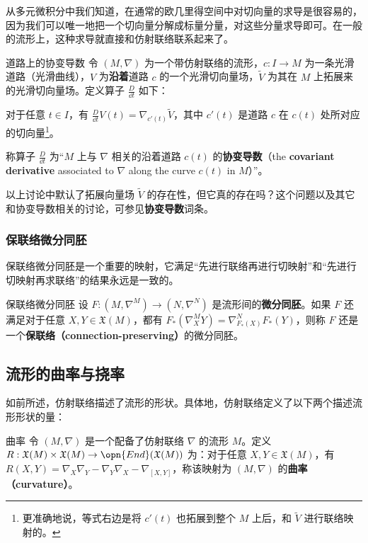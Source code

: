 从多元微积分中我们知道，在通常的欧几里得空间中对切向量的求导是很容易的，因为我们可以唯一地把一个切向量分解成标量分量，对这些分量求导即可。在一般的流形上，这种求导就直接和仿射联络联系起来了。

\begin{definition}{道路上的协变导数}
令 $(M, \nabla)$ 为一个带仿射联络的流形，$c:I\to M$ 为一条光滑道路（光滑曲线），$V$ 为\textbf{沿着}道路 $c$ 的一个光滑切向量场，$\tilde{V}$ 为其在 $M$ 上拓展来的光滑切向量场。定义算子 $\frac{D}{\dd t}$ 如下：

对于任意 $t\in I$，有 $\frac{D}{\dd t}V(t)=\nabla_{c'(t)}\tilde{V}$，其中 $c'(t)$ 是道路 $c$ 在 $c(t)$ 处所对应的切向量\footnote{更准确地说，等式右边是将 $c'(t)$ 也拓展到整个 $M$ 上后，和 $\tilde{V}$ 进行联络映射的。}。

称算子 $\frac{D}{\dd t}$ 为“$M$ 上与 $\nabla$ 相关的沿着道路 $c(t)$ 的\textbf{协变导数}（the \textbf{covariant derivative} associated to $\nabla$ along the curve $c(t)$ in $M$）”。
\end{definition}

以上讨论中默认了拓展向量场 $\tilde{V}$ 的存在性，但它真的存在吗？这个问题以及其它和协变导数相关的讨论，可参见\textbf{协变导数}词条。





\subsubsection{保联络微分同胚}

保联络微分同胚是一个重要的映射，它满足“先进行联络再进行切映射”和“先进行切映射再求联络”的结果永远是一致的。

\begin{definition}{保联络微分同胚}
设 $F:(M, \nabla^M)\to (N, \nabla^N)$ 是流形间的\textbf{微分同胚}。如果 $F$ 还满足对于任意 $X, Y\in \mathfrak{X}(M)$，都有 $F_*(\nabla^M_XY)=\nabla^N_{F_*(X)}F_*(Y)$，则称 $F$ 还是一个\textbf{保联络（connection-preserving）}的微分同胚。
\end{definition}




\subsection{流形的曲率与挠率}

如前所述，仿射联络描述了流形的形状。具体地，仿射联络定义了以下两个描述流形形状的量：

\begin{definition}{曲率}
令 $(M, \nabla)$ 是一个配备了仿射联络 $\nabla$ 的流形 $M$。定义 $R:\mathfrak{X}(M)\times\mathfrak{X}(M)\to\opn{End}(\mathfrak{X}(M))$ 为：对于任意 $X, Y\in\mathfrak{X}(M)$，有 $R(X, Y)=\nabla_X\nabla_Y-\nabla_Y\nabla_X-\nabla_{[X, Y]}$，称该映射为 $(M, \nabla)$ 的\textbf{曲率（curvature）}。
\end{definition}

